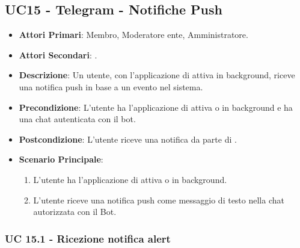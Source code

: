 \subsection{UC15 - Telegram - Notifiche Push}
		
		
	\begin{itemize}
		\item \textbf{Attori Primari}: Membro, Moderatore ente, Amministratore.
		\item \textbf{Attori Secondari}: .
		\item \textbf{Descrizione}: Un utente, con l'applicazione di  attiva in background, riceve una notifica push in base a un evento nel sistema. 
		\item \textbf{Precondizione}: L'utente ha l'applicazione di  attiva o in background e ha una chat autenticata con il bot.
		\item \textbf{Postcondizione}: L'utente riceve una notifica da parte di .
		\item \textbf{Scenario Principale}:
		\begin{enumerate}
			\item L'utente ha l'applicazione di  attiva o in background. 
			\item L'utente riceve una notifica push come messaggio di testo nella chat autorizzata con il Bot.
		\end{enumerate}
	\end{itemize}
	
	\subsubsection{UC 15.1 - Ricezione notifica alert}

